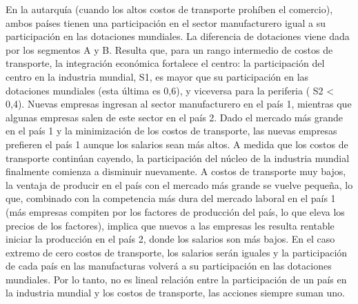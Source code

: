 En la autarquía (cuando los altos costos de transporte prohíben el comercio), ambos países tienen una participación en el sector manufacturero igual a su participación en las dotaciones mundiales. La diferencia de dotaciones viene dada por los segmentos A y B. Resulta que, para un rango intermedio de costos de transporte, la integración económica fortalece el centro: la participación del centro en la industria mundial, S1, es mayor que su participación en las dotaciones mundiales (esta última es 0,6), y viceversa para la periferia ( S2 < 0,4). Nuevas empresas ingresan al sector manufacturero en el país 1, mientras que algunas empresas salen de este sector en el país 2. Dado el mercado más grande en el país 1 y la minimización de los costos de transporte, las nuevas empresas prefieren el país 1 aunque los salarios sean más altos. A medida que los costos de transporte continúan cayendo, la participación del núcleo de la industria mundial finalmente comienza a disminuir nuevamente. A costos de transporte muy bajos, la ventaja de producir en el país con el mercado más grande se vuelve pequeña, lo que, combinado con la competencia más dura del mercado laboral en el país 1 (más empresas compiten por los factores de producción del país, lo que eleva los precios de los factores), implica que nuevos a las empresas les resulta rentable iniciar la producción en el país 2, donde los salarios son más bajos. En el caso extremo de cero costos de transporte, los salarios serán iguales y la participación de cada país en las manufacturas volverá a su participación en las dotaciones mundiales. Por lo tanto, no es lineal relación entre la participación de un país en la industria mundial y los costos de transporte, las acciones siempre suman uno.\\
